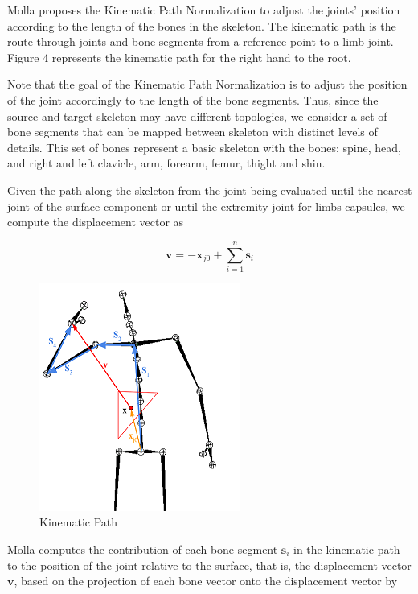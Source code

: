 \documentclass{vgtc}
\makeatletter
\def\maxwidth{\ifdim\Gin@nat@width>\linewidth\linewidth
    \else\Gin@nat@width\fi}
\let\Oldincludegraphics\includegraphics
\renewcommand{\includegraphics}[1]{\Oldincludegraphics[width=.8\maxwidth]{#1}}
\makeatother
\begin{document}
Molla proposes the Kinematic Path Normalization to adjust the joints'
position according to the length of the bones in the skeleton. The
kinematic path is the route through joints and bone segments from a
reference point to a limb joint. Figure 4 represents the kinematic path
for the right hand to the root.

Note that the goal of the Kinematic Path Normalization is to adjust the
position of the joint accordingly to the length of the bone segments.
Thus, since the source and target skeleton may have different
topologies, we consider a set of bone segments that can be mapped
between skeleton with distinct levels of details. This set of bones
represent a basic skeleton with the bones: spine, head, and right and
left clavicle, arm, forearm, femur, thight and shin.

Given the path along the skeleton from the joint being evaluated until
the nearest joint of the surface component or until the extremity joint
for limbs capsules, we compute the displacement vector as

\begin{equation}
\label{eq:dispvector}
\mathbf{v} = \mathbf{-x}_{j0} + \sum_{i=1}^{n} \mathbf{s}_i
\end{equation}

\begin{figure}
\centering
\includegraphics{../figures/SkeletonKinematicPath.png}
\caption{Kinematic Path}
\end{figure}

Molla computes the contribution of each bone segment \(\mathbf{s}_i\) in
the kinematic path to the position of the joint relative to the surface,
that is, the displacement vector \(\mathbf{v}\), based on the projection
of each bone vector onto the displacement vector by
\end{document}
